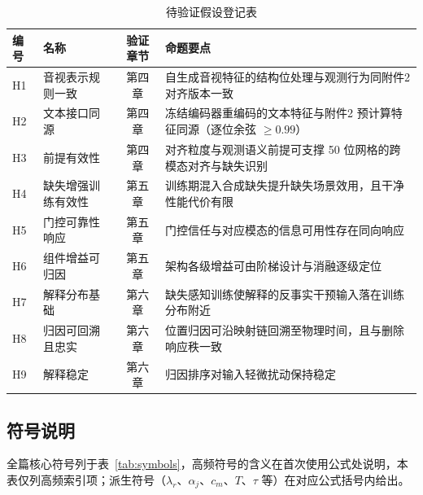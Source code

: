 \documentclass[colorprint,nocoverzero]{gmcmthesis}
\begin{document}
\begin{table}[htbp]
  \centering
  \caption{待验证假设登记表}
  \label{tab:hypotheses}
  \small
  \begin{tabularx}{\textwidth}{@{}llcX@{}}
    \toprule
    编号 & 名称 & 验证章节 & 命题要点 \\
    \midrule
    H1 & 音视表示规则一致 & 第四章 & 自生成音视特征的结构位处理与观测行为同附件2 对齐版本一致 \\
    H2 & 文本接口同源 & 第四章 & 冻结编码器重编码的文本特征与附件2 预计算特征同源（逐位余弦 $\ge 0.99$） \\
    H3 & 前提有效性 & 第四章 & 对齐粒度与观测语义前提可支撑 50 位网格的跨模态对齐与缺失识别 \\
    H4 & 缺失增强训练有效性 & 第五章 & 训练期混入合成缺失提升缺失场景效用，且干净性能代价有限 \\
    H5 & 门控可靠性响应 & 第五章 & 门控信任与对应模态的信息可用性存在同向响应 \\
    H6 & 组件增益可归因 & 第五章 & 架构各级增益可由阶梯设计与消融逐级定位 \\
    H7 & 解释分布基础 & 第六章 & 缺失感知训练使解释的反事实干预输入落在训练分布附近 \\
    H8 & 归因可回溯且忠实 & 第六章 & 位置归因可沿映射链回溯至物理时间，且与删除响应秩一致 \\
    H9 & 解释稳定 & 第六章 & 归因排序对输入轻微扰动保持稳定 \\
    \bottomrule
  \end{tabularx}
\end{table}

\subsection{符号说明}\label{sec:symbols}
全篇核心符号列于表~\ref{tab:symbols}，高频符号的含义在首次使用公式处说明，本表仅列高频索引项；派生符号（$\lambda_r$、$\alpha_j$、$c_m$、$T$、$\tau$ 等）在对应公式括号内给出。
\end{document}

